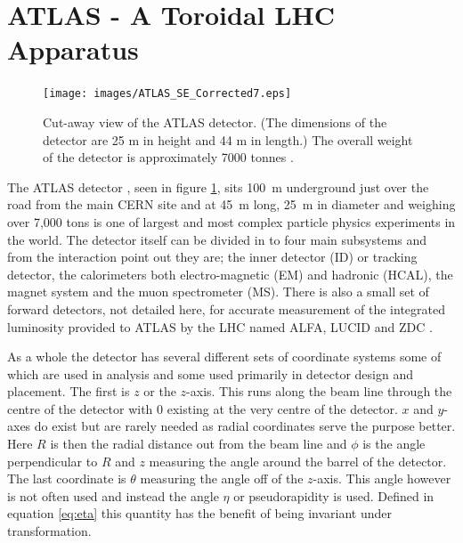 
\section{ATLAS - A Toroidal LHC Apparatus}

	\begin{figure}[h]
		\begin{center}
			\texttt{[image: images/ATLAS\_SE\_Corrected7.eps]}
		\end{center}
		\caption{Cut-away view of the ATLAS detector. (The dimensions of the detector are 25 m in height and 44 m in length.) The overall weight of the detector is approximately 7000 tonnes \cite{Aad:1129811}.}
		\label{fig:ATLAS_cutaway}
	\end{figure}


	The ATLAS detector \cite{Aad:1129811}, seen in figure \ref{fig:ATLAS_cutaway}, sits \SI{100}{\m} underground just over the road from the main CERN site and at \SI{45}{\m} long, \SI{25}{\m} in diameter and weighing over 7,000 tons is one of largest and most complex particle physics experiments in the world. The detector itself can be divided in to four main subsystems and from the interaction point out they are; the inner detector (ID) or tracking detector, the calorimeters both electro-magnetic (EM) and hadronic (HCAL), the magnet system and the muon spectrometer (MS). There is also a small set of forward detectors, not detailed here, for accurate measurement of the integrated luminosity provided to ATLAS by the LHC named ALFA, LUCID and ZDC \cite{Aad:1129811}. 

	As a whole the detector has several different sets of coordinate systems some of which are used in analysis and some used primarily in detector design and placement. The first is $z$ or the $z$-axis. This runs along the beam line through the centre of the detector with 0 existing at the very centre of the detector. $x$ and $y$-axes do exist but are rarely needed as radial coordinates serve the purpose better. Here $R$ is then the radial distance out from the beam line and $\phi$ is the angle perpendicular to $R$ and $z$ measuring the angle around the barrel of the detector. The last coordinate is $\theta$ measuring the angle off of the $z$-axis. This angle however is not often used and instead the angle $\eta$ or pseudorapidity is used. Defined in equation \ref{eq:eta} this quantity has the benefit of being invariant under transformation.


